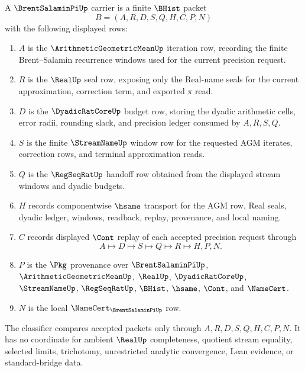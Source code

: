 \begin{definition}
\label{def:brent-salamin-pi-carrier}
A $\BrentSalaminPiUp$ carrier is a finite $\BHist$ packet
$$
B=(A,R,D,S,Q,H,C,P,N)
$$
with the following displayed rows:
\begin{enumerate}
\item $A$ is the $\ArithmeticGeometricMeanUp$ iteration row, recording the finite Brent--Salamin recurrence windows used for the current precision request.
\item $R$ is the $\RealUp$ seal row, exposing only the Real-name seals for the current approximation, correction term, and exported $\pi$ read.
\item $D$ is the $\DyadicRatCoreUp$ budget row, storing the dyadic arithmetic cells, error radii, rounding slack, and precision ledger consumed by $A,R,S,Q$.
\item $S$ is the finite $\StreamNameUp$ window row for the requested AGM iterates, correction rows, and terminal approximation reads.
\item $Q$ is the $\RegSeqRatUp$ handoff row obtained from the displayed stream windows and dyadic budgets.
\item $H$ records componentwise $\hsame$ transport for the AGM row, Real seals, dyadic ledger, windows, readback, replay, provenance, and local naming.
\item $C$ records displayed $\Cont$ replay of each accepted precision request through
$$
A\longmapsto D\longmapsto S\longmapsto Q\longmapsto R\longmapsto H,P,N .
$$
\item $P$ is the $\Pkg$ provenance over $\BrentSalaminPiUp$, $\ArithmeticGeometricMeanUp$, $\RealUp$, $\DyadicRatCoreUp$, $\StreamNameUp$, $\RegSeqRatUp$, $\BHist$, $\hsame$, $\Cont$, and $\NameCert$.
\item $N$ is the local $\NameCert_{\BrentSalaminPiUp}$ row.
\end{enumerate}
The classifier compares accepted packets only through $A,R,D,S,Q,H,C,P,N$. It has no coordinate for ambient $\RealUp$ completeness, quotient stream equality, selected limits, trichotomy, unrestricted analytic convergence, Lean evidence, or standard-bridge data.
\end{definition}

